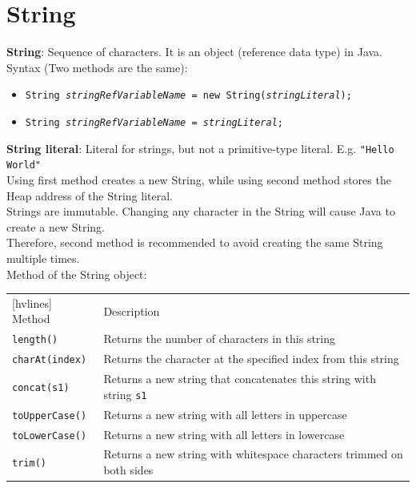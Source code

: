 \documentclass{article}
\begin{document}
\section{String}
\textbf{String}: Sequence of characters. It is an object (reference data type) in Java.\\
Syntax (Two methods are the same):
\begin{itemize}
	\item \texttt{String \textit{stringRefVariableName} = new String(\textit{stringLiteral});}
	\item \texttt{String \textit{stringRefVariableName} = \textit{stringLiteral};}
\end{itemize}
\textbf{String literal}: Literal for strings, but not a primitive-type literal. E.g. \texttt{"Hello World"}\\
Using first method creates a new String, while using second method stores the Heap address of the String literal.\\
Strings are immutable. Changing any character in the String will cause Java to create a new String.\\
Therefore, second method is recommended to avoid creating the same String multiple times.\\

Method of the String object:

\begin{table}[h!]
	\centering
	\begin{NiceTabular}{||ll||}[hvlines]
		\RowStyle{\bfseries}Method & Description\\
		\texttt{length()} & Returns the number of characters in this string\\
		\texttt{charAt(index)} & Returns the character at the specified index from this string\\
		\texttt{concat(s1)} & Returns a new string that concatenates this string with string \texttt{s1}\\
		\texttt{toUpperCase()} & Returns a new string with all letters in uppercase\\
		\texttt{toLowerCase()} & Returns a new string with all letters in lowercase\\
		\texttt{trim()} & Returns a new string with whitespace characters trimmed on both sides
	\end{NiceTabular}
\end{table}
\end{document}
